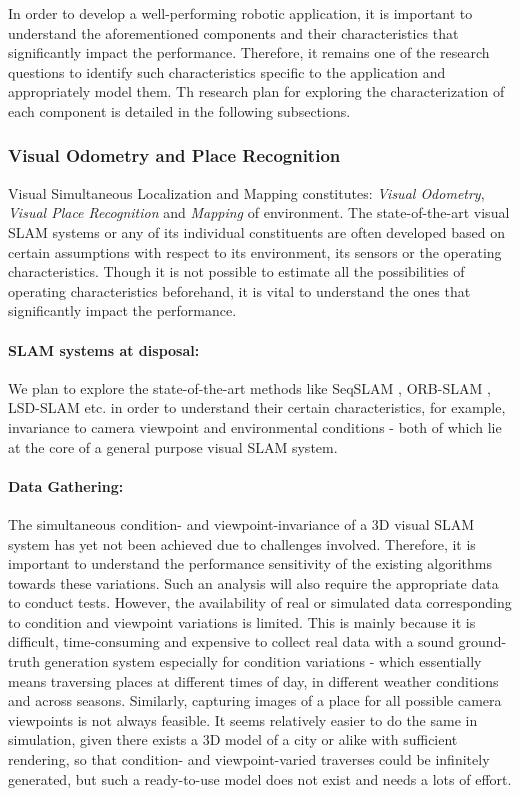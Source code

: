 \documentclass{article}
\begin{document}
In order to develop a well-performing robotic application, it is important to understand the aforementioned components and their characteristics that significantly impact the performance. Therefore, it remains one of the research questions to identify such characteristics specific to the application and appropriately model them. Th research plan for exploring the characterization of each component is detailed in the following subsections.

\subsubsection{Visual Odometry and Place Recognition}
Visual Simultaneous Localization and Mapping constitutes: \emph{Visual Odometry}, \emph{Visual Place Recognition} and \emph{Mapping} of environment. The state-of-the-art visual SLAM systems or any of its individual constituents are often developed based on certain assumptions with respect to its environment, its sensors or the operating characteristics. Though it is not possible to estimate all the possibilities of operating characteristics beforehand, it is vital to understand the ones that significantly impact the performance.

\paragraph{SLAM systems at disposal:}We plan to explore the state-of-the-art methods like SeqSLAM \cite{Milford2012}, ORB-SLAM \cite{Mur-Artal2015}, LSD-SLAM \cite{Engel2014lsd} etc. in order to understand their certain characteristics, for example, invariance to camera viewpoint and environmental conditions - both of which lie at the core of a general purpose visual SLAM system.

\paragraph{Data Gathering:}The simultaneous condition- and viewpoint-invariance of a 3D visual SLAM system has yet not been achieved due to challenges involved. Therefore, it is important to understand the performance sensitivity of the existing algorithms towards these variations. Such an analysis will also require the appropriate data to conduct tests. However, the availability of real or simulated data corresponding to condition and viewpoint variations is limited. This is mainly because it is difficult, time-consuming and expensive to collect real data with a sound ground-truth generation system especially for condition variations - which essentially means traversing places at different times of day, in different weather conditions and across seasons. Similarly, capturing images of a place for all possible camera viewpoints is not always feasible. It seems relatively easier to do the same in simulation, given there exists a 3D model of a city or alike with sufficient rendering, so that condition- and viewpoint-varied traverses could be infinitely generated, but such a ready-to-use model does not exist and needs a lots of effort.
\end{document}
